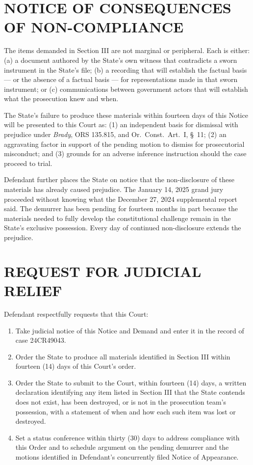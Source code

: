 \documentclass[12pt,letterpaper]{extarticle}
\begin{document}
\section{NOTICE OF CONSEQUENCES OF NON-COMPLIANCE}

The items demanded in Section III are not marginal or peripheral. Each is either:
(a) a document authored by the State's own witness that contradicts a sworn
instrument in the State's file; (b) a recording that will establish the factual
basis --- or the absence of a factual basis --- for representations made in that
sworn instrument; or (c) communications between government actors that will
establish what the prosecution knew and when.

The State's failure to produce these materials within fourteen days of this Notice
will be presented to this Court as: (1) an independent basis for dismissal with
prejudice under \textit{Brady}, ORS 135.815, and Or.\ Const.\ Art.\ I, \S~11;
(2) an aggravating factor in support of the pending motion to dismiss for
prosecutorial misconduct; and (3) grounds for an adverse inference instruction
should the case proceed to trial.

Defendant further places the State on notice that the non-disclosure of these
materials has already caused prejudice. The January 14, 2025 grand jury proceeded
without knowing what the December 27, 2024 supplemental report said. The demurrer
has been pending for fourteen months in part because the materials needed to fully
develop the constitutional challenge remain in the State's exclusive possession.
Every day of continued non-disclosure extends the prejudice.

\section{REQUEST FOR JUDICIAL RELIEF}

Defendant respectfully requests that this Court:

\begin{enumerate}[leftmargin=0.5in, label=\arabic*., itemsep=4pt]

\item Take judicial notice of this Notice and Demand and enter it in the record
of case 24CR49043.

\item Order the State to produce all materials identified in Section III within
fourteen (14) days of this Court's order.

\item Order the State to submit to the Court, within fourteen (14) days, a written
declaration identifying any item listed in Section III that the State contends does
not exist, has been destroyed, or is not in the prosecution team's possession,
with a statement of when and how each such item was lost or destroyed.

\item Set a status conference within thirty (30) days to address compliance with
this Order and to schedule argument on the pending demurrer and the motions
identified in Defendant's concurrently filed Notice of Appearance.

\end{enumerate}
\end{document}
